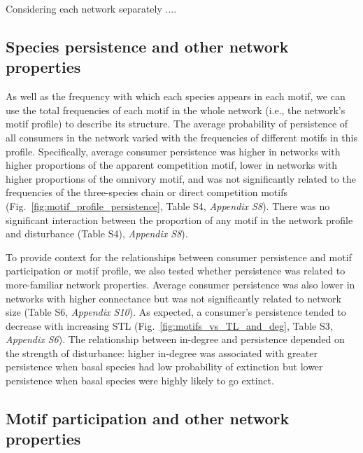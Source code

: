 \documentclass[12pt]{article}
\begin{document}
\begin{spacing}{2.0}
        Considering each network separately ....

    \subsection*{Species persistence and other network properties}

        As well as the frequency with which each species appears in each motif, we can use the total frequencies of each motif in the whole network (i.e., the network's motif profile) to describe its structure.
        The average probability of persistence of all consumers in the network varied with the frequencies of different motifs in this profile.
        Specifically, average consumer persistence was higher in networks with higher proportions of the apparent competition motif, lower in networks with higher proportions of the omnivory motif, and was not significantly related to the frequencies of the three-species chain or direct competition motifs (Fig.~\ref{fig:motif_profile_persistence}, Table S4, \emph{Appendix S8}). 
        There was no significant interaction between the proportion of any motif in the network profile and disturbance (Table S4), \emph{Appendix S8}).


        To provide context for the relationships between consumer persistence and motif participation or motif profile, we also tested whether persistence was related to more-familiar network properties.
        Average consumer persistence was also lower in networks with higher connectance but was not significantly related to network size (Table S6, \emph{Appendix S10}).
        As expected, a consumer's persistence tended to decrease with increasing STL (Fig.~\ref{fig:motifs_vs_TL_and_deg}, Table S3, \emph{Appendix S6}).
        The relationship between in-degree and persistence depended on the strength of disturbance: higher in-degree was associated with greater persistence when basal species had low probability of extinction but lower persistence when basal species were highly likely to go extinct.


    \subsection*{Motif participation and other network properties}


\end{spacing}
\end{document}
